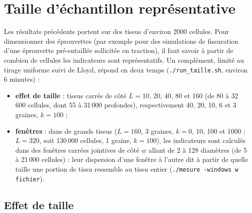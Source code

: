 \documentclass[10pt,a4paper]{article}
\newcommand{\code}[1]{\texttt{#1}}
\begin{document}
\section{Taille d'échantillon représentative}\label{sec:taille}

Les résultats précédents portent sur des tissus d'environ 2000 cellules. Pour dimensionner des éprouvettes (par
exemple pour des simulations de fissuration d'une éprouvette pré-entaillée sollicitée en traction), il faut savoir
à partir de combien de cellules les indicateurs sont représentatifs. Un complément, limité au tirage uniforme
suivi de Lloyd, répond en deux temps (\code{./run\_taille.sh}, environ 6 minutes) :
\begin{itemize}
  \item \textbf{effet de taille} : tissus carrés de côté $L=10$, 20, 40, 80 et 160 (de 80 à 32\,600 cellules, dont
    55 à 31\,000 profondes), respectivement 40, 20, 10, 6 et 3 graines, $k=100$ ;
  \item \textbf{fenêtres} : dans de grands tissus ($L=160$, 3 graines, $k=0$, 10, 100 et 1000 ; $L=320$, soit
    130\,000 cellules, 1 graine, $k=100$), les indicateurs sont calculés dans des fenêtres carrées jointives de
    côté $w$ allant de 2 à 128 diamètres (de 5 à 21\,000 cellules) : leur dispersion d'une fenêtre à l'autre dit
    à partir de quelle taille une portion de tissu ressemble au tissu entier
    (\code{./mesure -windows w fichier}).
\end{itemize}

\subsection{Effet de taille}
\end{document}
